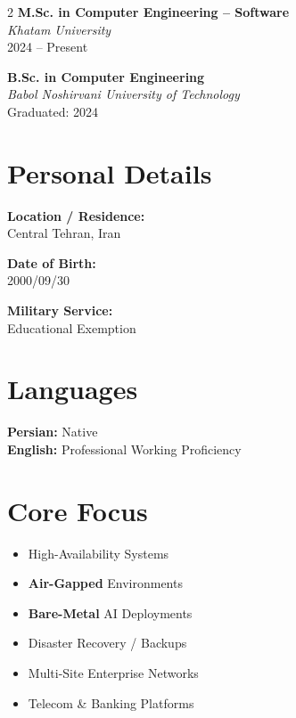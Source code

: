 \documentclass[10pt,a4paper]{article}
\begin{document}
\begin{paracol}{2}
\textbf{M.Sc. in Computer Engineering -- Software} \\
\textit{Khatam University} \\
2024 -- Present

\vspace{8pt}

\textbf{B.Sc. in Computer Engineering} \\
\textit{Babol Noshirvani University of Technology} \\
Graduated: 2024

\vspace{12pt}

\section{Personal Details}

\textbf{Location / Residence:} \\
Central Tehran, Iran

\vspace{6pt}

\textbf{Date of Birth:} \\
2000/09/30

\vspace{6pt}

\textbf{Military Service:} \\
Educational Exemption

\vspace{12pt}

\section{Languages}

\textbf{Persian:} Native \\
\textbf{English:} Professional Working Proficiency

\vspace{12pt}

\section{Core Focus}

\begin{itemize}
    \item High-Availability Systems
    \item \textbf{Air-Gapped} Environments
    \item \textbf{Bare-Metal} AI Deployments
    \item Disaster Recovery / Backups
    \item Multi-Site Enterprise Networks
    \item Telecom \& Banking Platforms
\end{itemize}

\end{paracol}
\end{document}
